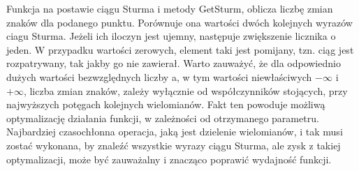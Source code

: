 Funkcja na postawie ciągu Sturma i metody GetSturm, oblicza liczbę zmian znaków dla podanego punktu. Porównuje ona wartości dwóch kolejnych wyrazów ciagu Sturma. Jeżeli ich iloczyn jest ujemny, następuje zwiększenie licznika o jeden. W przypadku wartości zerowych, element taki jest pomijany, tzn. ciąg jest rozpatrywany, tak jakby go nie zawierał. Warto zauważyć, że dla odpowiednio dużych wartości bezwzględnych liczby a, w tym wartości niewłaściwych $-\infty$ i $+\infty$, liczba zmian znaków, zależy wyłącznie od współczynników stojących, przy najwyższych potęgach kolejnych wielomianów. Fakt ten powoduje możliwą optymalizację działania funkcji, w zależności od otrzymanego parametru. Najbardziej czasochłonna operacja, jaką jest dzielenie wielomianów, i tak musi zostać wykonana, by znaleźć wszystkie wyrazy ciągu Sturma, ale zysk z takiej optymalizacji, może być zauważalny i znacząco poprawić wydajność funkcji.